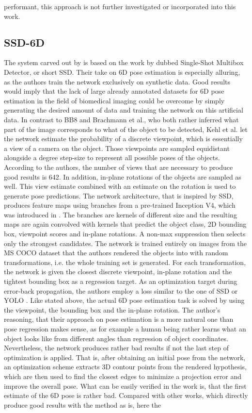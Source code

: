 performant, this approach is not further investigated or incorporated into this work.

\subsection{SSD-6D}

The system carved out by \cite{ssd-6d} is based on the work by \cite{ssd} dubbed Single-Shot Multibox Detector, or short SSD. Their take on 6D pose estimation is especially alluring, as the authors train the network exclusively on synthetic data. Good results would imply that the lack of large already annotated datasets for 6D pose estimation in the field of biomedical imaging could be overcome by simply generating the desired amount of data and training the network on this artificial data. In contrast to BB8 and Brachmann et al., who both rather inferred what part of the image corresponds to what of the object to be detected, Kehl et al. let the network estimate the probability of a discrete viewpoint, which is essentially a view of a camera on the object. Those viewpoints are sampled equidistant alongside a degree step-size to represent all possible poses of the objects. According to the authors, the number of views that are necessary to produce good results is 642. In addition, in-plane rotations of the objects are sampled as well. This view estimate combined with an estimate on the rotation is used to generate pose predictions. The network architecture, that is inspired by SSD, produces feature maps using branches from a pre-trained Inception V4, which was introduced in \cite{inceptionv4}. The branches are kernels of different size and the resulting maps are again convolved with kernels that predict the object class, 2D bounding box, viewpoint scores and in-plane rotations. A non-max suppression then selects only the strongest candidates. The network is trained entirely on images from the MS COCO dataset \cite{mscoco} that the authors rendered the objects into with random transformations, i.e. the whole training set is generated. For each transformation, the network is given the closest discrete viewpoint, in-plane rotation and the tightest bounding box as a regression target. As an optimization target during error-back propagation, the authors employ a loss similar to the one of SSD \cite{ssd} or YOLO \cite{yolo}. Like stated above, the actual 6D pose estimation task is solved by using the viewpoint, the bounding box and the in-plane rotation. The author's reasoning, that their approach on pose estimation is a more natural one than pose regression makes sense, as for example a human being rather learns what an object looks like from different angles than regression of object coordinates. Nevertheless, the network produces rather bad results if not the last step of optimization is applied. That is, after obtaining an initial pose from the network, an optimization scheme extracts 3D contour points from the rendered hypothesis, which are then used to find the closest edges to minimize a projection error and improve the overall pose. What can be easily verified in the work is, that the first estimate of the 6D pose is rather bad. Compared with other works, which directly produce good results with the method as is, here the 